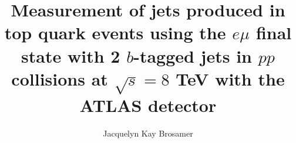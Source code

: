 \documentclass[12pt]{ucbthesis}
\begin{document}

\title{Measurement of jets produced in top quark events using the $e\mu$ final state with 2 $b$-tagged jets in $pp$ collisions at $\sqrt{s}=8$ TeV with the ATLAS detector}
\author{Jacquelyn Kay Brosamer}
\prevdegrees{}



\end{document}
